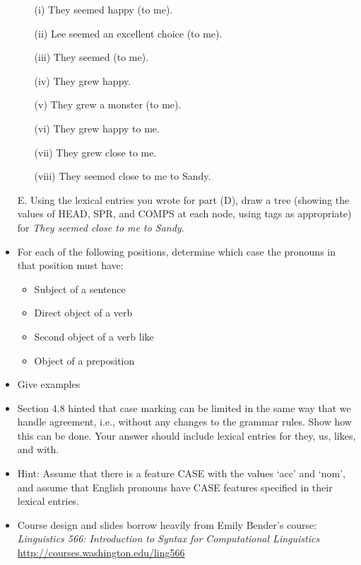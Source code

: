 \documentclass[a4paper,landscape,headrule,footrule,dvips]{foils}
\begin{document}
\begin{itemize}
   \begin{itemize}
   \item[(i)] They seemed happy (to me).
   \item[(ii)] Lee seemed an excellent choice (to me).
   \item[(iii)] \bad They seemed (to me).
   \item[(iv)] They grew happy.
   \item[(v)] \bad They grew a monster (to me).
   \item[(vi)] \bad They grew happy to me.
   \item[(vii)] They grew close to me.
   \item[(viii)] They seemed close to me to Sandy.
   \end{itemize}

\newpage
\item[E.] Using the lexical entries you wrote for part (D), draw
a tree (showing the values of HEAD, SPR, and COMPS at each node,
using tags as appropriate) for {\it They seemed close to me to Sandy}.

\end{itemize}



\begin{itemize}
\item For each of the following positions,
determine which case the pronouns in that
position must have:
\begin{itemize}
\item Subject of a sentence
\item Direct object of a verb
\item Second object of a verb like 
\item Object of a preposition
\end{itemize}
\item Give examples
\end{itemize}

\begin{itemize}
\item Section 4.8 hinted that case marking can be
limited in the same way that we handle
agreement, i.e., without any changes to the
grammar rules. Show how this can be done.
Your answer should include lexical entries
for they, us, likes, and with.
\item Hint: Assume that there is a feature CASE
with the values ‘acc’ and ‘nom’, and assume
that English pronouns have CASE features
specified in their lexical entries.
\end{itemize}


\begin{itemize}
\item Course design and slides borrow heavily from Emily Bender's course:
\textit{Linguistics 566: Introduction to Syntax for Computational Linguistics}
\\ \url{http://courses.washington.edu/ling566}
\end{itemize}
\end{document}
